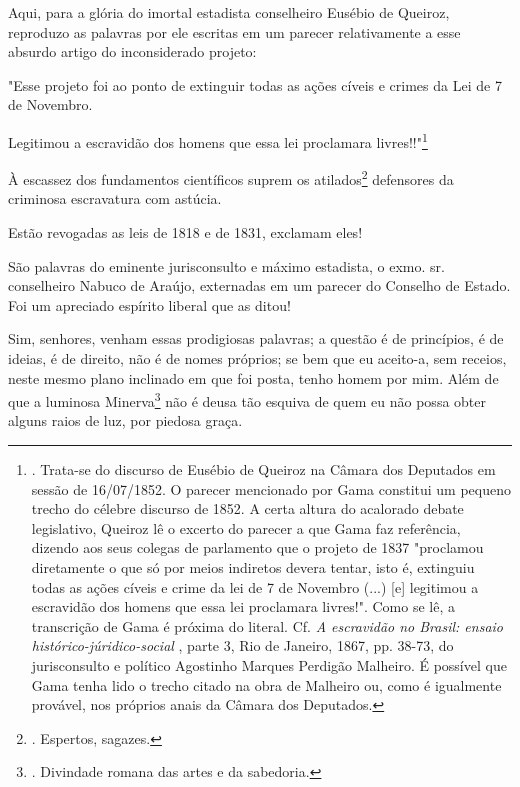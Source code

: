 Aqui, para a glória do imortal estadista conselheiro Eusébio de Queiroz,
reproduzo as palavras por ele escritas em um parecer relativamente a
esse absurdo artigo do inconsiderado projeto:

"Esse projeto foi ao ponto de extinguir todas as ações cíveis e crimes
da Lei de 7 de Novembro.

Legitimou a escravidão dos homens que essa lei proclamara
livres!!"\footnote{. Trata-se do discurso de Eusébio de Queiroz na
  Câmara dos Deputados em sessão de 16/07/1852. O parecer mencionado por
  Gama constitui um pequeno trecho do célebre discurso de 1852. A certa
  altura do acalorado debate legislativo, Queiroz lê o excerto do
  parecer a que Gama faz referência, dizendo aos seus colegas de
  parlamento que o projeto de 1837 "proclamou diretamente o que só por
  meios indiretos devera tentar, isto é, extinguiu todas as ações cíveis
  e crime da lei de 7 de Novembro (...) {[}e{]} legitimou a escravidão
  dos homens que essa lei proclamara livres!". Como se lê, a transcrição
  de Gama é próxima do literal. Cf. \emph{A escravidão no Brasil: ensaio
  histórico-júridico-social} , parte 3, Rio de Janeiro, 1867, pp. 38-73,
  do jurisconsulto e político Agostinho Marques Perdigão Malheiro. É
  possível que Gama tenha lido o trecho citado na obra de Malheiro ou,
  como é igualmente provável, nos próprios anais da Câmara dos
  Deputados.}

À escassez dos fundamentos científicos suprem os atilados\footnote{.
  Espertos, sagazes.} defensores da criminosa escravatura com astúcia.

Estão revogadas as leis de 1818 e de 1831, exclamam eles!

São palavras do eminente jurisconsulto e máximo estadista, o exmo. sr.
conselheiro Nabuco de Araújo, externadas em um parecer do Conselho de
Estado. Foi um apreciado espírito liberal que as ditou!

Sim, senhores, venham essas prodigiosas palavras; a questão é de
princípios, é de ideias, é de direito, não é de nomes próprios; se bem
que eu aceito-a, sem receios, neste mesmo plano inclinado em que foi
posta, tenho homem por mim. Além de que a luminosa Minerva\footnote{.
  Divindade romana das artes e da sabedoria.} não é deusa tão esquiva de
quem eu não possa obter alguns raios de luz, por piedosa graça.


